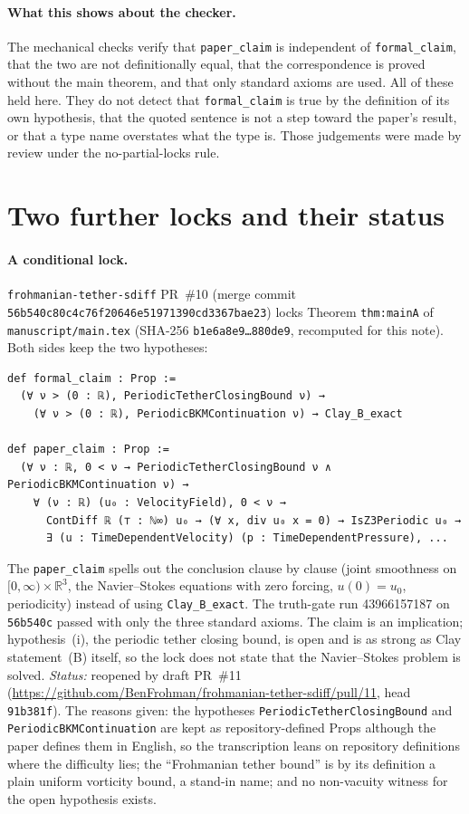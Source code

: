 \documentclass[11pt,a4paper]{article}
\newcommand{\code}[1]{\texttt{#1}}
\begin{document}
\paragraph{What this shows about the checker.} The mechanical checks verify that
\code{paper\_claim} is independent of \code{formal\_claim}, that the two are not definitionally
equal, that the correspondence is proved without the main theorem, and that only standard axioms
are used. All of these held here. They do not detect that \code{formal\_claim} is true by the
definition of its own hypothesis, that the quoted sentence is not a step toward the paper's
result, or that a type name overstates what the type is. Those judgements were made by review
under the no-partial-locks rule.

\section{Two further locks and their status}

\paragraph{A conditional lock.} \code{frohmanian-tether-sdiff} PR~\#10 (merge commit
\code{56b540c80c4c76f20646e51971390cd3367bae23}) locks Theorem \code{thm:mainA} of
\code{manuscript/main.tex} (SHA-256 \code{b1e6a8e9\ldots880de9}, recomputed for this note).
Both sides keep the two hypotheses:
\begin{Verbatim}
def formal_claim : Prop :=
  (∀ ν > (0 : ℝ), PeriodicTetherClosingBound ν) →
    (∀ ν > (0 : ℝ), PeriodicBKMContinuation ν) → Clay_B_exact

def paper_claim : Prop :=
  (∀ ν : ℝ, 0 < ν → PeriodicTetherClosingBound ν ∧ PeriodicBKMContinuation ν) →
    ∀ (ν : ℝ) (u₀ : VelocityField), 0 < ν →
      ContDiff ℝ (⊤ : ℕ∞) u₀ → (∀ x, div u₀ x = 0) → IsZ3Periodic u₀ →
      ∃ (u : TimeDependentVelocity) (p : TimeDependentPressure), ...
\end{Verbatim}
The \code{paper\_claim} spells out the conclusion clause by clause (joint smoothness on
$[0,\infty)\times\mathbb{R}^3$, the Navier--Stokes equations with zero forcing, $u(0)=u_0$,
periodicity) instead of using \code{Clay\_B\_exact}. The truth-gate run 43966157187 on
\code{56b540c} passed with only the three standard axioms. The claim is an implication;
hypothesis~(i), the periodic tether closing bound, is open and is as strong as Clay
statement~(B) itself, so the lock does not state that the Navier--Stokes problem is solved.
\emph{Status:} reopened by draft PR~\#11
(\url{https://github.com/BenFrohman/frohmanian-tether-sdiff/pull/11}, head \code{91b381f}). The
reasons given: the hypotheses \code{PeriodicTetherClosingBound} and
\code{PeriodicBKMContinuation} are kept as repository-defined Props although the paper defines
them in English, so the transcription leans on repository definitions where the difficulty lies;
the ``Frohmanian tether bound'' is by its definition a plain uniform vorticity bound, a stand-in
name; and no non-vacuity witness for the open hypothesis exists.
\end{document}
